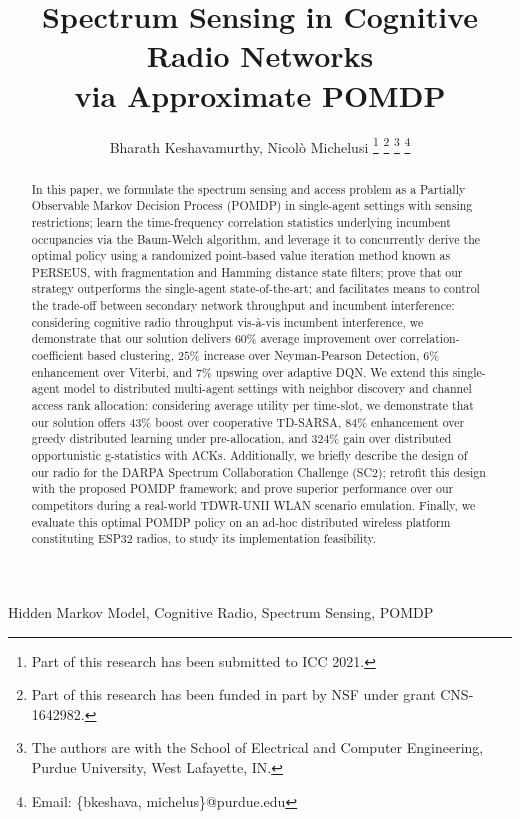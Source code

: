 \documentclass[12pt, draftcls, onecolumn]{IEEEtran}
\title{Spectrum Sensing in Cognitive Radio Networks
\\
via Approximate POMDP}
\author{Bharath Keshavamurthy, Nicol\`{o} Michelusi
\thanks{Part of this research has been submitted to ICC 2021.}
\thanks{Part of this research has been funded in part by NSF under grant CNS-1642982.}
\thanks{The authors are with the School of Electrical and Computer Engineering, Purdue University, West Lafayette, IN.}
\thanks{Email: \{bkeshava, michelus\}@purdue.edu}
\vspace{-12mm}}
\begin{document}
\maketitle
\thispagestyle{plain}
\pagestyle{plain} 
\begin{abstract}
In this paper, we formulate the spectrum sensing and access problem as a Partially Observable Markov Decision Process (POMDP) in single-agent settings with sensing restrictions; learn the time-frequency correlation statistics underlying incumbent occupancies via the Baum-Welch algorithm, and leverage it to concurrently derive the optimal policy using a randomized point-based value iteration method known as PERSEUS, with fragmentation and Hamming distance state filters; prove that our strategy outperforms the single-agent state-of-the-art; and facilitates means to control the trade-off between secondary network throughput and incumbent interference: considering cognitive radio throughput vis-à-vis incumbent interference, we demonstrate that our solution delivers $60$\% average improvement over correlation-coefficient based clustering, $25$\% increase over Neyman-Pearson Detection, $6$\% enhancement over Viterbi, and $7$\% upswing over adaptive DQN. We extend this single-agent model to distributed multi-agent settings with neighbor discovery and channel access rank allocation: considering average utility per time-slot, we demonstrate that our solution offers $43$\% boost over cooperative TD-SARSA, $84$\% enhancement over greedy distributed learning under pre-allocation, and $324$\% gain over distributed opportunistic g-statistics with ACKs. Additionally, we briefly describe the design of our radio for the DARPA Spectrum Collaboration Challenge (SC2); retrofit this design with the proposed POMDP framework; and prove superior performance over our competitors during a real-world TDWR-UNII WLAN scenario emulation. Finally, we evaluate this optimal POMDP policy on an ad-hoc distributed wireless platform constituting ESP32 radios, to study its implementation feasibility.
\end{abstract}
\begin{IEEEkeywords}
Hidden Markov Model, Cognitive Radio, Spectrum Sensing, POMDP
\end{IEEEkeywords}
\end{document}
